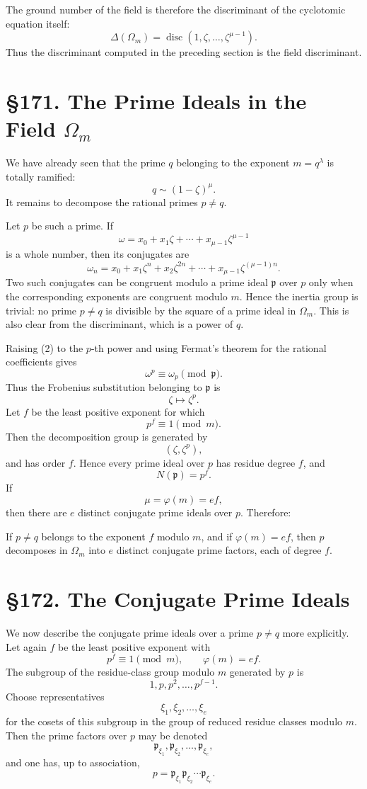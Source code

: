 \documentclass[11pt,a4paper]{book}
\newcommand{\webersection}[2]{\clearpage\section*{\S #1. #2}}
\newcommand{\p}{\mathfrak p}
\DeclareMathOperator{\disc}{disc}
\begin{document}
The ground number of the field is therefore the discriminant of the cyclotomic equation itself:
\[
  \Delta(\Omega_m)=\disc(1,\zeta,\ldots,\zeta^{\mu-1}).
\tag{6}
\]
Thus the discriminant computed in the preceding section is the field discriminant.

\webersection{171}{The Prime Ideals in the Field \(\Omega_m\)}

We have already seen that the prime \(q\) belonging to the exponent \(m=q^\lambda\) is totally ramified:
\[
  q\sim (1-\zeta)^\mu.
\]
It remains to decompose the rational primes \(p\ne q\).

Let \(p\) be such a prime.  If
\[
  \omega=x_0+x_1\zeta+\cdots+x_{\mu-1}\zeta^{\mu-1}
\tag{1}
\]
is a whole number, then its conjugates are
\[
  \omega_n=x_0+x_1\zeta^n+x_2\zeta^{2n}+\cdots+x_{\mu-1}\zeta^{(\mu-1)n}.
\tag{2}
\]
Two such conjugates can be congruent modulo a prime ideal \(\p\) over \(p\) only when the corresponding exponents are congruent modulo \(m\).  Hence the inertia group is trivial: no prime \(p\ne q\) is divisible by the square of a prime ideal in \(\Omega_m\).  This is also clear from the discriminant, which is a power of \(q\).

Raising (2) to the \(p\)-th power and using Fermat's theorem for the rational coefficients gives
\[
  \omega^p\equiv \omega_p \pmod{\p}.
\tag{3}
\]
Thus the Frobenius substitution belonging to \(\p\) is
\[
  \zeta\mapsto\zeta^p.
\]
Let \(f\) be the least positive exponent for which
\[
  p^f\equiv1\pmod m.
\tag{4}
\]
Then the decomposition group is generated by
\[
  (\zeta,\zeta^p),
\]
and has order \(f\).  Hence every prime ideal over \(p\) has residue degree \(f\), and
\[
  N(\p)=p^f.
\tag{5}
\]
If
\[
  \mu=\varphi(m)=ef,
\]
then there are \(e\) distinct conjugate prime ideals over \(p\).  Therefore:

If \(p\ne q\) belongs to the exponent \(f\) modulo \(m\), and if \(\varphi(m)=ef\), then \(p\) decomposes in \(\Omega_m\) into \(e\) distinct conjugate prime factors, each of degree \(f\).

\webersection{172}{The Conjugate Prime Ideals}

We now describe the conjugate prime ideals over a prime \(p\ne q\) more explicitly.  Let again \(f\) be the least positive exponent with
\[
  p^f\equiv1\pmod m,\qquad \varphi(m)=ef.
\tag{1}
\]
The subgroup of the residue-class group modulo \(m\) generated by \(p\) is
\[
  1,p,p^2,\ldots,p^{f-1}.
\tag{2}
\]
Choose representatives
\[
  \xi_1,\xi_2,\ldots,\xi_e
\]
for the cosets of this subgroup in the group of reduced residue classes modulo \(m\).  Then the prime factors over \(p\) may be denoted
\[
  \p_{\xi_1},\p_{\xi_2},\ldots,\p_{\xi_e},
\]
and one has, up to association,
\[
  p=\p_{\xi_1}\p_{\xi_2}\cdots\p_{\xi_e}.
\tag{3}
\]
\end{document}
